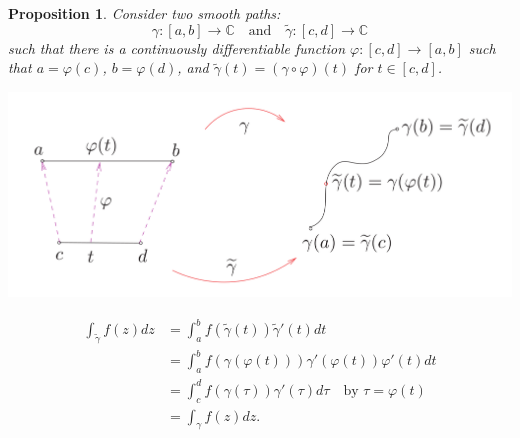 \documentclass[12pt,openany]{book}
\newtheorem{proposition}[theorem]{Proposition}
\theoremstyle{definition}
\newcommand{\C}{\mathbb{C}}
\newcommand{\of}[1]{\left( #1 \right)}
\begin{document}
	\begin{tcolorbox}[colback=white,colframe=procolor,arc=5pt,title={\color{white}\bf Equivalent paths give the same integral}]
		\begin{proposition}
			Consider two smooth paths: \[
			\gamma:[a,b]\to\C\quad\text{and}
			\quad\tilde{\gamma}:[c,d]\to\C
			\] such that there is a continuously differentiable function $\varphi:[c,d]\to[a,b]$ such that $a=\varphi\of{c}$, $b=\varphi\of{d}$, and $\tilde{\gamma}\of{t}=\of{\gamma\circ\varphi}\of{t}$ for $t\in[c,d]$. 
			\begin{center}
				\includegraphics[scale=0.25]{equivalent_paths.png}
			\end{center}
			\begin{align*}
			\int_{\tilde{\gamma}}f\of{z}dz
			&=\int_a^bf\of{\tilde{\gamma}\of{t}}{\tilde{\gamma}'\of{t}}dt \\
			&=\int_a^bf\of{\gamma\of{\varphi\of{t}}}\gamma'\of{\varphi\of{t}}\varphi'\of{t}dt\\
			&=\int_c^df\of{\gamma\of{\tau}}\gamma'\of{\tau}d\tau\quad\text{by $\tau=\varphi\of{t}$}\\
			&=\int_{\gamma}f\of{z}dz.
			\end{align*}
		\end{proposition}
	\end{tcolorbox}
	
\end{document}
